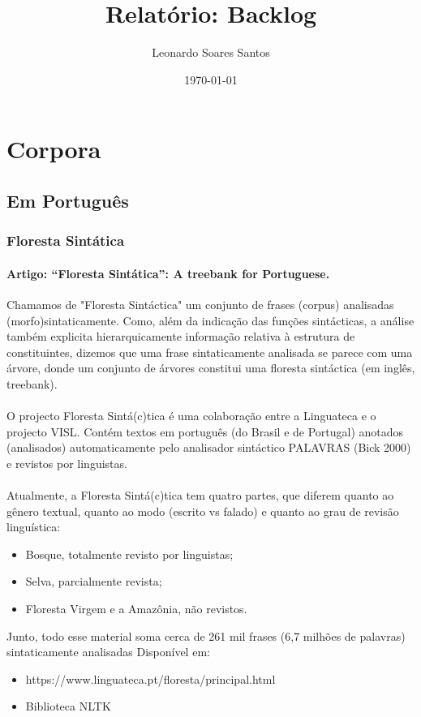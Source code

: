 \documentclass[a4paper, 10pt]{article}
\begin{document}
	\title{Relatório: Backlog}
	\author{Leonardo Soares Santos}
	\date{\today}
	
	\maketitle	
	\section{Corpora}
    	\subsection{Em Português}
        	\subsubsection{Floresta Sintática}
            
            	\paragraph{Artigo: “Floresta Sintática”: A treebank for Portuguese.} Chamamos de "Floresta Sintáctica" um conjunto de frases (corpus) analisadas (morfo)sintaticamente. Como, além da indicação das funções sintácticas, a análise também explicita hierarquicamente informação relativa à estrutura de constituintes, dizemos que uma frase sintaticamente analisada se parece com uma árvore, donde um conjunto de árvores constitui uma floresta sintáctica (em inglês, treebank).
            	\paragraph{} O projecto Floresta Sintá(c)tica é uma colaboração entre a Linguateca e o projecto VISL. Contém textos em português (do Brasil e de Portugal) anotados (analisados) automaticamente pelo analisador sintáctico PALAVRAS (Bick 2000) e revistos por linguistas.
            	\paragraph{} Atualmente, a Floresta Sintá(c)tica tem quatro partes, que diferem quanto ao gênero textual, quanto ao modo (escrito vs falado) e quanto ao grau de revisão linguística: 
            \begin{itemize}
				\item Bosque, totalmente revisto por linguistas;
                \item Selva, parcialmente revista;
                \item Floresta Virgem e a Amazônia, não revistos.
			\end{itemize}
             Junto, todo esse material soma cerca de 261 mil frases (6,7 milhões de palavras) sintaticamente analisadas
             Disponível em:
             \begin{itemize}
				\item https://www.linguateca.pt/floresta/principal.html
				\item Biblioteca NLTK
			\end{itemize}
\end{document}
